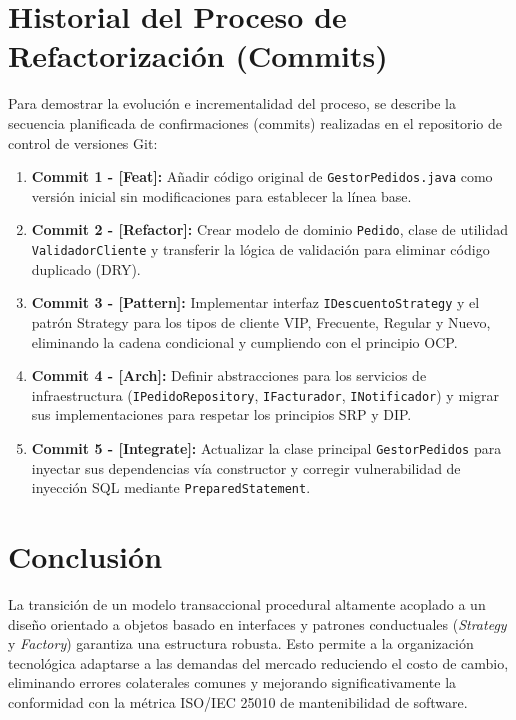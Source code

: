 \documentclass[12pt, a4paper]{article}
\begin{document}
\newpage
\section{Historial del Proceso de Refactorización (Commits)}
Para demostrar la evolución e incrementalidad del proceso, se describe la secuencia planificada de confirmaciones (commits) realizadas en el repositorio de control de versiones Git:

\begin{enumerate}
    \item \textbf{Commit 1 - [Feat]:} Añadir código original de \texttt{GestorPedidos.java} como versión inicial sin modificaciones para establecer la línea base.
    \item \textbf{Commit 2 - [Refactor]:} Crear modelo de dominio \texttt{Pedido}, clase de utilidad \texttt{ValidadorCliente} y transferir la lógica de validación para eliminar código duplicado (DRY).
    \item \textbf{Commit 3 - [Pattern]:} Implementar interfaz \texttt{IDescuentoStrategy} y el patrón Strategy para los tipos de cliente VIP, Frecuente, Regular y Nuevo, eliminando la cadena condicional y cumpliendo con el principio OCP.
    \item \textbf{Commit 4 - [Arch]:} Definir abstracciones para los servicios de infraestructura (\texttt{IPedidoRepository}, \texttt{IFacturador}, \texttt{INotificador}) y migrar sus implementaciones para respetar los principios SRP y DIP.
    \item \textbf{Commit 5 - [Integrate]:} Actualizar la clase principal \texttt{GestorPedidos} para inyectar sus dependencias vía constructor y corregir vulnerabilidad de inyección SQL mediante \texttt{PreparedStatement}.
\end{enumerate}

\section{Conclusión}
La transición de un modelo transaccional procedural altamente acoplado a un diseño orientado a objetos basado en interfaces y patrones conductuales (\textit{Strategy} y \textit{Factory}) garantiza una estructura robusta. Esto permite a la organización tecnológica adaptarse a las demandas del mercado reduciendo el costo de cambio, eliminando errores colaterales comunes y mejorando significativamente la conformidad con la métrica ISO/IEC 25010 de mantenibilidad de software.
\end{document}
